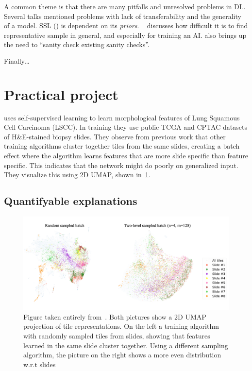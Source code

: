 \documentclass[10pt,twocolumn,letterpaper]{article}
\begin{document}
A common theme is that there are many pitfalls and unresolved problems in \gls{DL}. Several talks mentioned problems with lack of transferability and the generality of a model. \gls{SSL} () is dependent on its \textit{priors}. ~ discusses how difficult it is to find representative sample in general, and especially for training an \gls{AI}.  also brings up the need to ``sanity check existing sanity checks''.


Finally\dots{}

\newpage

\section{Practical project}
\cite{sslUMAP} uses self-supervised learning to learn morphological features of Lung Squamous Cell Carcinoma (LSCC). In training they use public TCGA and CPTAC datasets of H\&E-stained biopsy slides. They observe from previous work that other training algorithms cluster together tiles from the same slides, creating a batch effect where the algorithm learns features that are more slide specific than feature specific. This indicates that the network might do poorly on generalized input. They visualize this using 2D UMAP, shown in~\cref{fig:umap}.

\subsection{Quantifyable explanations}\label{sec:quantifiable}

\begin{figure}
  \includegraphics[scale=.17]{./umap.png}
  \caption{Figure taken entirely from~\cite{sslUMAP}. Both pictures show a 2D UMAP projection of tile representations. On the left a training algorithm with randomly sampled tiles from slides, showing that features learned in the same slide cluster together. Using a different sampling algorithm, the picture on the right shows a more even distribution w.r.t slides}
  \label{fig:umap}
\end{figure}
\end{document}
